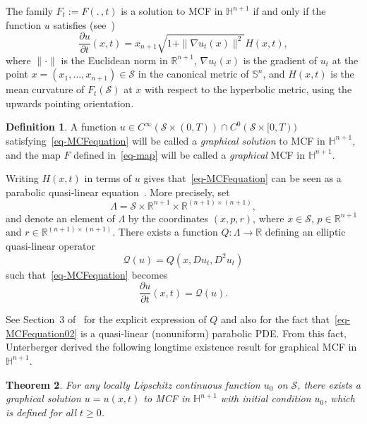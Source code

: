 \documentclass{amsart}[12pt]
\newcommand{\cS}{\mathcal{S}}
\newtheorem{theorem}{Theorem}[section]
\theoremstyle{definition}
\newtheorem{definition}[theorem]{Definition}
\theoremstyle{plain}
\newcommand{\R}{\mathbb{R} }
\newcommand{\h}{\mathbb{H} }
\newcommand{\s}{\mathbb{S}}
\renewcommand{\Lambda}{\varLambda}
\begin{document}
The family $F_t:=F(.\,, t)$ is a solution to MCF
in $\h^{n+1}$ if and only if the function $u$ satisfies (see~\cite{LX,unterberger})
\begin{equation} \label{eq-MCFequation}
\frac{\partial u}{\partial t}(x,t)
=x_{n+1}\sqrt{1+\|\nabla u_t(x)\|^2}H(x,t),
\end{equation}
where $\|\cdot\|$ is the Euclidean norm in $\R^{n+1}$,
$\nabla u_t(x)$ is the gradient of $u_t$ at
the point $x=(x_1,\dots,x_{n+1})\in\mathcal S$
in the canonical metric of $\s^n$,
and $H(x,t)$ is the mean curvature of $F_t(\cS)$ at $x$
with respect to the hyperbolic metric, using the upwards pointing orientation.



\begin{definition}
A function $u\in C^{\infty}(\cS\times (0,T))\cap C^{0}(\cS\times [0,T))$
satisfying~\eqref{eq-MCFequation} will be called a \emph{graphical solution}
to MCF in $\h^{n+1}$, and the map $F$ defined in~\eqref{eq-map} will be called a
\emph{graphical} MCF in $\h^{n+1}$.
\end{definition}



Writing $H(x,t)$ in terms of $u$ gives that~\eqref{eq-MCFequation}
can be seen as a parabolic quasi-linear equation~\cite{unterberger}.
More precisely, set
$$\Lambda = \cS\times \R^{n+1}\times \R^{(n+1)\times(n+1)},$$
and denote an element of $\Lambda$ by the coordinates $(x,p,r)$,
where $x\in \cS$, $p\in \R^{n+1}$ and
$r \in \R^{(n+1)\times(n+1)}$.
There exists a function $Q\colon \Lambda\to \R$
defining an elliptic quasi-linear operator
\begin{equation}\label{eqopQ}
\mathcal Q(u) = Q(x,Du_t,D^2u_t)
\end{equation}
such that~\eqref{eq-MCFequation} becomes
\begin{equation} \label{eq-MCFequation02}
\frac{\partial u}{\partial t}(x,t)=\mathcal Q(u).
\end{equation}

See Section~3 of~\cite{unterberger} for the explicit expression
of $Q$ and also for the fact that~\eqref{eq-MCFequation02} is
a quasi-linear (nonuniform) parabolic PDE. From this
fact, Unterberger derived the following longtime existence result
for graphical MCF in $\h^{n+1}$.

\begin{theorem}{\cite[Theorem 0.1]{unterberger}} \label{thm-unterberger}
For any locally Lipschitz continuous function $u_0$ on $\mathcal S$,
there exists a graphical solution $u=u(x,t)$ to {\rm MCF} in $\h^{n+1}$ with initial condition $u_0$, which
is defined for all $t\ge 0$.
\end{theorem}
\end{document}
